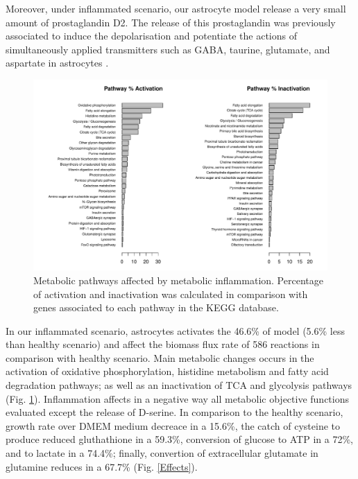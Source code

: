 Moreover, under inflammated scenario, our astrocyte model release a very small amount of prostaglandin D2. The release of this prostaglandin was previously associated to induce the depolarisation and potentiate the actions of simultaneously applied transmitters such as GABA, taurine, glutamate, and aspartate in astrocytes \cite{Murphy1988}.
\begin{figure}[h]
\begin{center}
\includegraphics[width=\textwidth]{neuroprotective/Healthy2Inflammated}
\end{center}
\caption{Metabolic pathways affected by metabolic inflammation. Percentage of activation and inactivation was calculated in comparison with genes associated to each pathway in the KEGG database.}
\label{h2i}
\end{figure}

In our inflammated scenario, astrocytes activates the 46.6\% of model (5.6\% less than healthy scenario) and affect the biomass flux rate of 586 reactions in comparison with healthy scenario. Main metabolic changes occurs in the activation of oxidative phosphorylation, histidine metabolism and fatty acid degradation pathways; as well as an inactivation of TCA and glycolysis pathways (Fig. \ref{h2i}). Inflammation affects in a negative way all metabolic objective functions evaluated except the release of D-serine. In comparison to the healthy scenario, growth rate over DMEM medium decreace in a 15.6\%, the catch of cysteine to produce reduced gluthathione in a 59.3\%, conversion of glucose to ATP in a 72\%, and to lactate in a 74.4\%; finally, convertion of extracellular glutamate in glutamine reduces in a 67.7\% (Fig. \ref{Effects}). 

